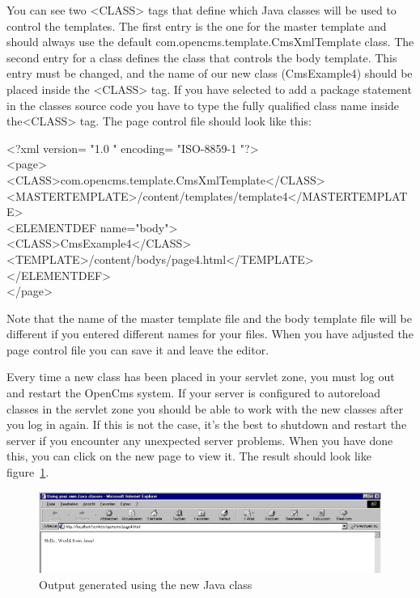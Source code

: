 You can see two {\tag <CLASS>} tags that define which Java classes will be
used to control the templates. The first entry is the one for the
master template and should always use the default
{\class com.opencms.template.CmsXmlTemplate} class. The second entry for a class
defines the class that controls the body template. This entry must be
changed, and the name of our new class ({\class CmsExample4}) should be placed
inside the {\tag <CLASS>} tag. If you have selected to add a package statement
in the classes source code you have to type the fully qualified class
name inside the{\tag <CLASS>} tag.
The page control file should look like this:

\begin{xml}
<?xml version= "1.0 " encoding= "ISO-8859-1 "?>\\
<page>\\
\xtaba <CLASS>com.opencms.template.CmsXmlTemplate</CLASS>\\
\xtaba <MASTERTEMPLATE>/content/templates/template4</MASTERTEMPLATE>\\
\xtaba <ELEMENTDEF name="body">\\
\xtaba <CLASS>CmsExample4</CLASS>\\
\xtaba <TEMPLATE>/content/bodys/page4.html</TEMPLATE>\\
\xtaba </ELEMENTDEF>\\
</page>\\
\end{xml}

Note that the name of the master template file and the body template
file will be different if you entered different names for your files.
When you have adjusted the {\name page control} file you can save it and leave
the editor.

Every time a new class has been placed in your servlet zone, you must
log out and restart the OpenCms system. If your server is configured to
autoreload classes in the servlet zone you should be able to work with
the new classes after you log in again. If this is not the case, it's
the best to shutdown and restart the server if you encounter any
unexpected server problems. When you have done this, you can click on
the new page to view it.
The result should look like figure~\ref{OutputJavaClass}.

\begin{figure}
\begin{center}
\includegraphics[clip,width=\sgw]{pics/modules/30}
\end{center}
\caption[Output generated using the new Java class]{Output generated using the new Java class}
\label{OutputJavaClass}
\end{figure}

